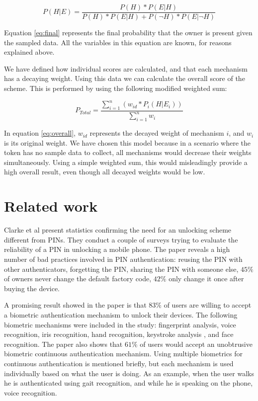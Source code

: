 \begin{equation} 
\label{eq:final}
P(H|E) = \frac{P(H) * P(E|H)}{P(H) * P(E|H) + P(\neg H) * P(E|\neg H)}
\end{equation}

Equation \ref{eq:final} represents the final probability that the owner is present given the sampled data. All the variables in this equation are known, for reasons explained above.

We have defined how individual scores are calculated, and that each mechanism has a decaying weight. Using this data we can calculate the overall score of the scheme. This is performed by using the following modified weighted sum:

\begin{equation} 
\label{eq:overall}
P_{Total} = \frac{\sum_{i=1}^{n}(w_{id} * P_i(H|E_i))}{\sum_{i=1}^{n}w_i}
\end{equation}

In equation \ref{eq:overall}, $w_{id}$ represents the decayed weight of mechanism $i$, and $w_i$ is its original weight. We have chosen this model because in a scenario where the token has no sample data to collect, all mechanisms would decrease their weights simultaneously. Using a simple weighted sum, this would misleadingly provide a high overall result, even though all decayed weights would be low.  

\section{Related work}
Clarke et al \cite{clarke2005authentication} present statistics confirming the need for an unlocking scheme different from PINs. They conduct a couple of surveys trying to evaluate the reliability of a PIN in unlocking a mobile phone. The paper reveals a high number of bad practices involved in PIN authentication: reusing the PIN with other authenticators, forgetting the PIN, sharing the PIN with someone else, $45\%$ of owners never change the default factory code, $42\%$ only change it once after buying the device.

A promising result showed in the paper is that $83\%$ of users are willing to accept a biometric authentication mechanism to unlock their devices. The following biometric mechanisms were included in the study: fingerprint analysis, voice recognition, iris recognition, hand recognition, keystroke analysis \cite{clarke2003using}, and face recognition. The paper also shows that $61\%$ of users would accept an unobtrusive biometric continuous authentication mechanism. Using multiple biometrics for continuous authentication is mentioned briefly, but each mechanism is used individually based on what the user is doing. As an example, when the user walks he is authenticated using gait recognition, and while he is speaking on the phone, voice recognition.

